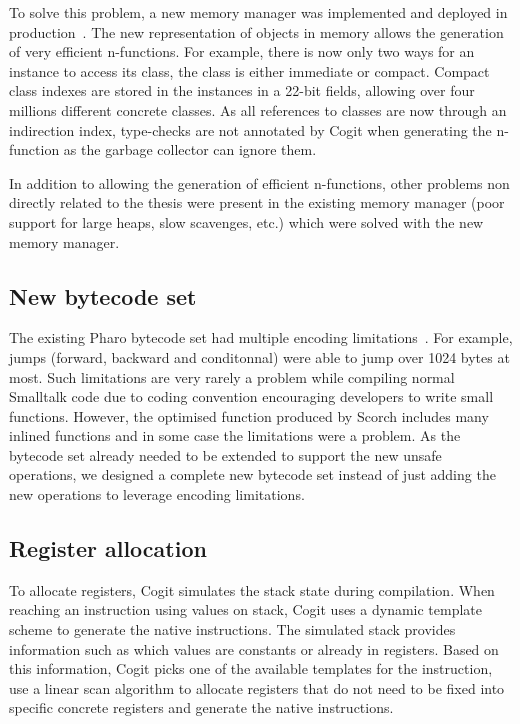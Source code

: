 \documentclass[a4paper,12pt,twoside]{../includes/ThesisStyle}
\begin{document}
To solve this problem, a new memory manager was implemented and deployed in production~\cite{Mir15a}. The new representation of objects in memory allows the generation of very efficient n-functions. For example, there is now only two ways for an instance to access its class, the class is either immediate or compact. Compact class indexes are stored in the instances in a 22-bit fields, allowing over four millions different concrete classes. As all references to classes are now through an indirection index, type-checks are not annotated by Cogit when generating the n-function as the garbage collector can ignore them.

In addition to allowing the generation of efficient n-functions, other problems non directly related to the thesis were present in the existing memory manager (poor support for large heaps, slow scavenges, etc.) which were solved with the new memory manager.


\subsection{New bytecode set}

The existing Pharo bytecode set had multiple encoding limitations~\cite{Bera14a}. For example, jumps (forward, backward and conditonnal) were able to jump over 1024 bytes at most. Such limitations are very rarely a problem while compiling normal Smalltalk code due to coding convention encouraging developers to write small functions. However, the optimised function produced by Scorch includes many inlined functions and in some case the limitations were a problem. As the bytecode set already needed to be extended to support the new unsafe operations, we designed a complete new bytecode set instead of just adding the new operations to leverage encoding limitations.

\subsection{Register allocation}

To allocate registers, Cogit simulates the stack state during compilation. When reaching an instruction using values on stack, Cogit uses a dynamic template scheme to generate the native instructions. The simulated stack provides information such as which values are constants or already in registers. Based on this information, Cogit picks one of the available templates for the instruction, use a linear scan algorithm to allocate registers that do not need to be fixed into specific concrete registers and generate the native instructions.
\end{document}
